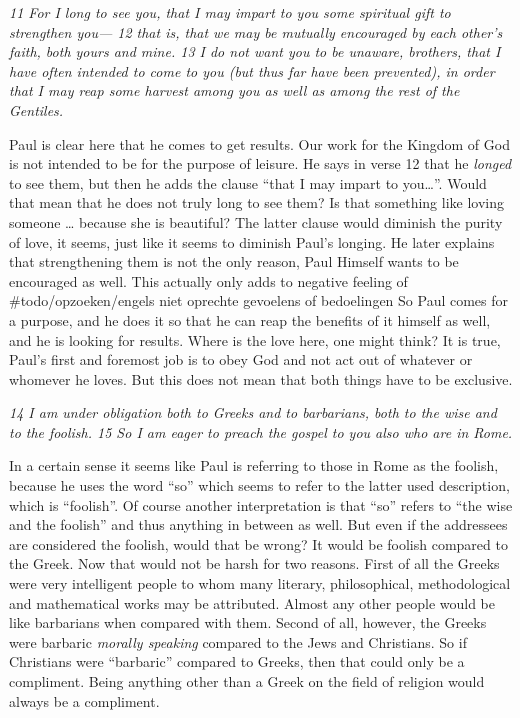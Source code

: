 \emph{11 For I long to see you, that I may impart to you some spiritual
gift to strengthen you--- 12 that is, that we may be mutually encouraged
by each other's faith, both yours and mine. 13 I do not want you to be
unaware, brothers, that I have often intended to come to you (but thus
far have been prevented), in order that I may reap some harvest among
you as well as among the rest of the Gentiles.}

Paul is clear here that he comes to get results. Our work for the
Kingdom of God is not intended to be for the purpose of leisure. He says
in verse 12 that he \emph{longed} to see them, but then he adds the
clause ``that I may impart to you\ldots{}''. Would that mean that he
does not truly long to see them? Is that something like loving someone
\ldots{} because she is beautiful? The latter clause would diminish the
purity of love, it seems, just like it seems to diminish Paul's longing.
He later explains that strengthening them is not the only reason, Paul
Himself wants to be encouraged as well. This actually only adds to
negative feeling of \#todo/opzoeken/engels niet oprechte gevoelens of
bedoelingen So Paul comes for a purpose, and he does it so that he can
reap the benefits of it himself as well, and he is looking for results.
Where is the love here, one might think? It is true, Paul's first and
foremost job is to obey God and not act out of whatever or whomever he
loves. But this does not mean that both things have to be exclusive.

\emph{14 I am under obligation both to Greeks and to barbarians, both to
the wise and to the foolish. 15 So I am eager to preach the gospel to
you also who are in Rome.}

In a certain sense it seems like Paul is referring to those in Rome as
the foolish, because he uses the word ``so'' which seems to refer to the
latter used description, which is ``foolish''. Of course another
interpretation is that ``so'' refers to ``the wise and the foolish'' and
thus anything in between as well. But even if the addressees are
considered the foolish, would that be wrong? It would be foolish
compared to the Greek. Now that would not be harsh for two reasons.
First of all the Greeks were very intelligent people to whom many
literary, philosophical, methodological and mathematical works may be
attributed. Almost any other people would be like barbarians when
compared with them. Second of all, however, the Greeks were barbaric
\emph{morally speaking} compared to the Jews and Christians. So if
Christians were ``barbaric'' compared to Greeks, then that could only be
a compliment. Being anything other than a Greek on the field of religion
would always be a compliment.

